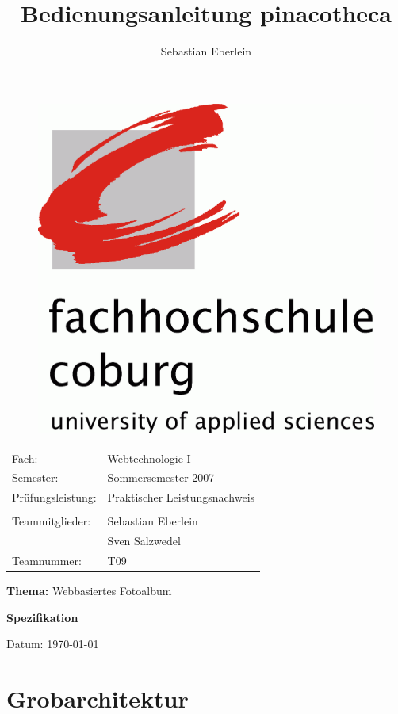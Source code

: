 \documentclass[a4paper,12pt,liststotocnumbered]{scrartcl}
\title{Bedienungsanleitung pinacotheca}
\author{Sebastian Eberlein}
\begin{document}
\pagestyle{empty}

\begin{figure}[h]
	\begin{center}
		\includegraphics[width=\textwidth/2]{logo}
	\end{center}
\end{figure}

\begin{tabularx}{\textwidth}{lX}
	Fach:&Webtechnologie I\\
	Semester:&Sommersemester 2007\\
	Prüfungsleistung:&Praktischer Leistungsnachweis\\
	&\\
	Teammitglieder:&Sebastian Eberlein\\
	&Sven Salzwedel\\
	Teamnummer:&T09\\
\end{tabularx}

\begin{center}
\end{center}

\begin{center}
	\Large{\textbf{Thema:} Webbasiertes Fotoalbum}\\
\end{center}
\begin{center}
	\Large{\textbf{Spezifikation}}\\
\end{center}

\begin{center}
	Datum: \today\\
\end{center}

\newpage

\pagestyle{scrheadings}

\tableofcontents

\newpage

\section{Grobarchitektur}
\end{document}
